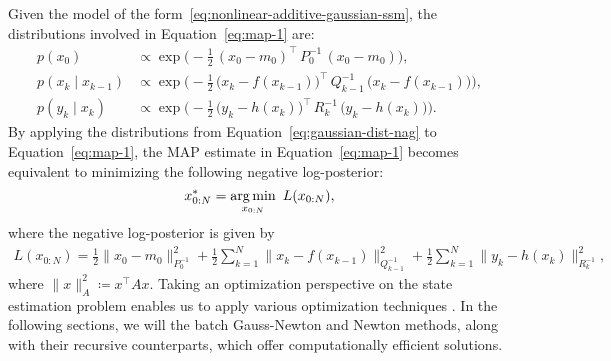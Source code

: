 \documentclass[dissertation,math,vertlayout,pdfa,colorlinks,nologo]{aaltoseries}
\begin{document}
Given the model of the form~\eqref{eq:nonlinear-additive-gaussian-ssm}, the distributions involved in Equation~\eqref{eq:map-1} are:
\begin{equation} \label{eq:gaussian-dist-nag}
    \begin{split}
        p(x_0) & \propto \exp{\bigg( -\frac{1}{2}\, (x_0 - m_0)^\top \, P_0^{-1} \, (x_0 - m_0) \bigg)}, \\
        p(x_{k} \mid x_{k-1}) & \propto \exp{\bigg( -\frac{1}{2}\, \big(x_{k} - f(x_{k-1})\big)^\top \, Q_{k-1}^{-1} \, \big(x_{k} - f(x_{k - 1})\big) \bigg)},\\
        p(y_{k} \mid x_k) & \propto \exp{\bigg( -\frac{1}{2}\, \big(y_{k} - h(x_{k})\big)^\top \, R_{k}^{-1} \, \big(y_{k} - h(x_{k})\big) \bigg)}.
    \end{split}
\end{equation}
By applying the distributions from Equation~\eqref{eq:gaussian-dist-nag} to Equation~\eqref{eq:map-1}, the MAP estimate in Equation~\eqref{eq:map-1} becomes equivalent to minimizing the following negative log-posterior:
\begin{equation} \label{eq:opt-L}
    x^*_{0:N} = \operatorname*{arg\,min}_{x_{0:N}}{\, \, L(x_{0:N})},
\end{equation}
where the negative log-posterior is given by
\begin{equation} \label{eq:objective-function}
\begin{split}
    L(x_{0:N}) = \frac{1}{2} \lVert x_{0}
    - m_{0} \rVert^{2}_{P_{0}^{-1}} + \frac{1}{2} \sum_{k=1}^{N} \lVert x_{k} - f(x_{k-1}) \rVert^{2}_{Q_{k-1}^{-1}}  + \frac{1}{2} \sum_{k=1}^{N} \lVert y_{k} - h(x_{k}) \rVert^{2}_{R_{k}^{-1}}, 
    \end{split}
\end{equation}
where $\lVert x \rVert^{2}_{A} \coloneqq x^\top A x$. Taking an optimization perspective on the state estimation problem enables us to apply various optimization techniques \citep{wright1999numerical}. In the following sections, we will the batch Gauss-Newton and Newton methods, along with their recursive counterparts, which offer computationally efficient solutions.
\end{document}
